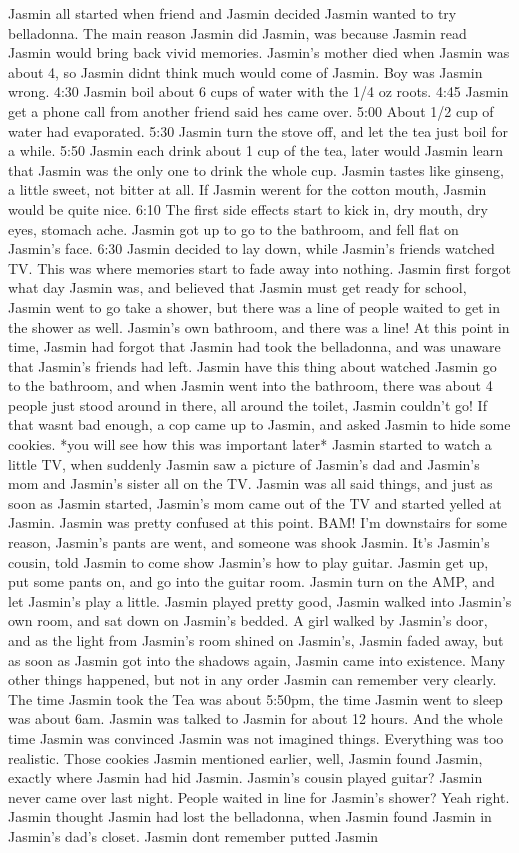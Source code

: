\documentclass[12pt]{book}
\begin{document}
Jasmin all started when friend and Jasmin decided Jasmin wanted to try belladonna. The main reason Jasmin did Jasmin, was because Jasmin read Jasmin would bring back vivid memories. Jasmin's mother died when Jasmin was about 4, so Jasmin didnt think much would come of Jasmin. Boy was Jasmin wrong. 4:30 Jasmin boil about 6 cups of water with the 1/4 oz roots. 4:45 Jasmin get a phone call from another friend said hes came over. 5:00 About 1/2 cup of water had evaporated. 5:30 Jasmin turn the stove off, and let the tea just boil for a while. 5:50 Jasmin each drink about 1 cup of the tea, later would Jasmin learn that Jasmin was the only one to drink the whole cup. Jasmin tastes like ginseng, a little sweet, not bitter at all. If Jasmin werent for the cotton mouth, Jasmin would be quite nice. 6:10 The first side effects start to kick in, dry mouth, dry eyes, stomach ache. Jasmin got up to go to the bathroom, and fell flat on Jasmin's face. 6:30 Jasmin decided to lay down, while Jasmin's friends watched TV. This was where memories start to fade away into nothing. Jasmin first forgot what day Jasmin was, and believed that Jasmin must get ready for school, Jasmin went to go take a shower, but there was a line of people waited to get in the shower as well. Jasmin's own bathroom, and there was a line! At this point in time, Jasmin had forgot that Jasmin had took the belladonna, and was unaware that Jasmin's friends had left. Jasmin have this thing about watched Jasmin go to the bathroom, and when Jasmin went into the bathroom, there was about 4 people just stood around in there, all around the toilet, Jasmin couldn't go! If that wasnt bad enough, a cop came up to Jasmin, and asked Jasmin to hide some cookies. *you will see how this was important later* Jasmin started to watch a little TV, when suddenly Jasmin saw a picture of Jasmin's dad and Jasmin's mom and Jasmin's sister all on the TV. Jasmin was all said things, and just as soon as Jasmin started, Jasmin's mom came out of the TV and started yelled at Jasmin. Jasmin was pretty confused at this point. BAM! I'm downstairs for some reason, Jasmin's pants are went, and someone was shook Jasmin. It's Jasmin's cousin, told Jasmin to come show Jasmin's how to play guitar. Jasmin get up, put some pants on, and go into the guitar room. Jasmin turn on the AMP, and let Jasmin's play a little. Jasmin played pretty good, Jasmin walked into Jasmin's own room, and sat down on Jasmin's bedded. A girl walked by Jasmin's door, and as the light from Jasmin's room shined on Jasmin's, Jasmin faded away, but as soon as Jasmin got into the shadows again, Jasmin came into existence. Many other things happened, but not in any order Jasmin can remember very clearly. The time Jasmin took the Tea was about 5:50pm, the time Jasmin went to sleep was about 6am. Jasmin was talked to Jasmin for about 12 hours. And the whole time Jasmin was convinced Jasmin was not imagined things. Everything was too realistic. Those cookies Jasmin mentioned earlier, well, Jasmin found Jasmin, exactly where Jasmin had hid Jasmin. Jasmin's cousin played guitar? Jasmin never came over last night. People waited in line for Jasmin's shower? Yeah right. Jasmin thought Jasmin had lost the belladonna, when Jasmin found Jasmin in Jasmin's dad's closet. Jasmin dont remember putted Jasmin 
\end{document}
